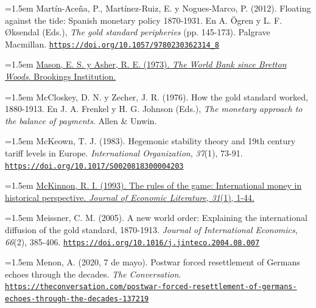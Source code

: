\documentclass[10pt,a4paper]{article}
\begin{document}
{\sloppy\noindent\hangindent=1.5em Martín-Aceña, P., Martínez-Ruiz, E. y Nogues-Marco, P. (2012). Floating against the tide: Spanish monetary policy 1870-1931. En A. Ögren y L. F. Øksendal (Eds.), \textit{The gold standard peripheries} (pp. 145-173). Palgrave Macmillan. \href{https://doi.org/10.1057/9780230362314_8}{\nolinkurl{https://doi.org/10.1057/9780230362314_8}}\par}

{\sloppy\noindent\hangindent=1.5em \href{https://www.brookings.edu/books/the-world-bank-since-bretton-woods/}{Mason, E. S. y Asher, R. E. (1973). \textit{The World Bank since Bretton Woods}. Brookings Institution.}\par}

\noindent\hangindent=1.5em McCloskey, D. N. y Zecher, J. R. (1976). How the gold standard worked, 1880-1913. En J. A. Frenkel y H. G. Johnson (Eds.), \textit{The monetary approach to the balance of payments}. Allen \& Unwin.

{\sloppy\noindent\hangindent=1.5em McKeown, T. J. (1983). Hegemonic stability theory and 19th century tariff levels in Europe. \textit{International Organization}, \textit{37}(1), 73-91. \href{https://doi.org/10.1017/S0020818300004203}{\nolinkurl{https://doi.org/10.1017/S0020818300004203}}\par}

{\sloppy\noindent\hangindent=1.5em \href{https://ideas.repec.org/a/aea/jeclit/v31y1993i1p1-44.html}{McKinnon, R. I. (1993). The rules of the game: International money in historical perspective. \textit{Journal of Economic Literature}, \textit{31}(1), 1-44.}\par}

{\sloppy\noindent\hangindent=1.5em Meissner, C. M. (2005). A new world order: Explaining the international diffusion of the gold standard, 1870-1913. \textit{Journal of International Economics}, \textit{66}(2), 385-406. \href{https://doi.org/10.1016/j.jinteco.2004.08.007}{\nolinkurl{https://doi.org/10.1016/j.jinteco.2004.08.007}}\par}

{\sloppy\noindent\hangindent=1.5em Menon, A. (2020, 7 de mayo). Postwar forced resettlement of Germans echoes through the decades. \textit{The Conversation}. \href{https://theconversation.com/postwar-forced-resettlement-of-germans-echoes-through-the-decades-137219}{\nolinkurl{https://theconversation.com/postwar-forced-resettlement-of-germans-echoes-through-the-decades-137219}}\par}
\end{document}
